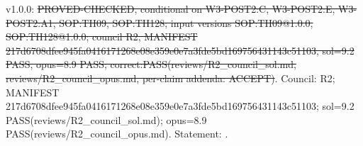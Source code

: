 \begin{theorem}[]\label{reg:W3-MISR_MIS_i_}
\end{theorem}
\begin{statusbox}
 v1.0.0: \st{PROVED-CHECKED, conditional on W3-POST2:C, W3-POST2:E, W3-POST2:A1, SOP:TH09, SOP:TH128; input versions SOP:TH09@1.0.0, SOP:TH128@1.0.0; council R2, MANIFEST 217d6708dfee945fa0416171268e08e359e0e7a3fde5bd169756431143c51103, sol=9.2 PASS, opus=8.9 PASS; correct:PASS(reviews/R2\_council\_sol.md, reviews/R2\_council\_opus.md, per-claim addenda: ACCEPT)}. Council: R2; MANIFEST 217d6708dfee945fa0416171268e08e359e0e7a3fde5bd169756431143c51103; sol=9.2 PASS(reviews/R2\_council\_sol.md); opus=8.9 PASS(reviews/R2\_council\_opus.md). Statement: .
\end{statusbox}
